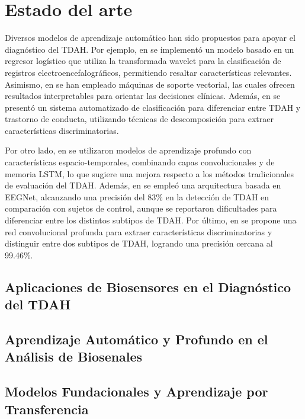 \section{Estado del arte}

Diversos modelos de aprendizaje automático han sido propuestos para apoyar el diagnóstico del TDAH. Por ejemplo, en \cite{10.1007/978-3-030-89691-1_41} se implementó un modelo basado en un regresor logístico que utiliza la transformada wavelet para la clasificación de registros electroencefalográficos, permitiendo resaltar características relevantes. Asimismo, en \cite{Vaidya202051} se han empleado máquinas de soporte vectorial, las cuales ofrecen resultados interpretables para orientar las decisiones clínicas. Además, en \cite{Tor2021} se presentó un sistema automatizado de clasificación para diferenciar entre TDAH y trastorno de conducta, utilizando técnicas de descomposición para extraer características discriminatorias.


Por otro lado, en \cite{Mao20191} se utilizaron modelos de aprendizaje profundo con características espacio-temporales, combinando capas convolucionales y de memoria LSTM, lo que sugiere una mejora respecto a los métodos tradicionales de evaluación del TDAH. Además, en \cite{Vahid2019} se empleó una arquitectura basada en EEGNet, alcanzando una precisión del 83\% en la detección de TDAH en comparación con sujetos de control, aunque se reportaron dificultades para diferenciar entre los distintos subtipos de TDAH. Por último, en \cite{AHMADI2021102227} se propone una red convolucional profunda para extraer características discriminatorias y distinguir entre dos subtipos de TDAH, logrando una precisión cercana al 99.46\%.



\subsection{Aplicaciones de Biosensores en el Diagnóstico del TDAH}

\subsection{Aprendizaje Automático y Profundo en el Análisis de Biosenales}

\subsection{Modelos Fundacionales y Aprendizaje por Transferencia}

